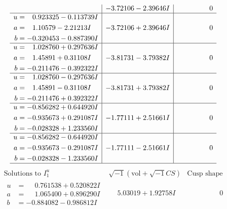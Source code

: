\documentclass[1p]{elsarticle_modified}
\theoremstyle{definition}
\newcommand{\I}{\sqrt{-1}}
\begin{document}
$$\begin{array}{c|c|c}
 & -3.72106 - 2.39646 I & \phantom{-0.000000 } 0 \\ \hline\begin{aligned}
u &= \phantom{-}0.923325 - 0.113739 I \\
a &= \phantom{-}1.10579 - 2.21213 I \\
b &= -0.320453 - 0.887390 I\end{aligned}
 & -3.72106 + 2.39646 I & \phantom{-0.000000 } 0 \\ \hline\begin{aligned}
u &= \phantom{-}1.028760 + 0.297636 I \\
a &= \phantom{-}1.45891 + 0.31108 I \\
b &= -0.211476 - 0.392322 I\end{aligned}
 & -3.81731 - 3.79382 I & \phantom{-0.000000 } 0 \\ \hline\begin{aligned}
u &= \phantom{-}1.028760 - 0.297636 I \\
a &= \phantom{-}1.45891 - 0.31108 I \\
b &= -0.211476 + 0.392322 I\end{aligned}
 & -3.81731 + 3.79382 I & \phantom{-0.000000 } 0 \\ \hline\begin{aligned}
u &= -0.856282 + 0.644920 I \\
a &= -0.935673 + 0.291087 I \\
b &= -0.028328 + 1.233560 I\end{aligned}
 & -1.77111 + 2.51661 I & \phantom{-0.000000 } 0 \\ \hline\begin{aligned}
u &= -0.856282 - 0.644920 I \\
a &= -0.935673 - 0.291087 I \\
b &= -0.028328 - 1.233560 I\end{aligned}
 & -1.77111 - 2.51661 I & \phantom{-0.000000 } 0\\
 \hline 
 \end{array}$$\newpage$$\begin{array}{c|c|c}  
\text{Solutions to }I^u_{1}& \I (\text{vol} + \sqrt{-1}CS) & \text{Cusp shape}\\
 \hline 
\begin{aligned}
u &= \phantom{-}0.761538 + 0.520822 I \\
a &= \phantom{-}1.065400 + 0.896290 I \\
b &= -0.884082 - 0.986812 I\end{aligned}
 & \phantom{-}5.03019 + 1.92758 I & \phantom{-0.000000 } 0 \\ \hline\begin{aligned}

\end{aligned}
\end{array}$$
\end{document}
